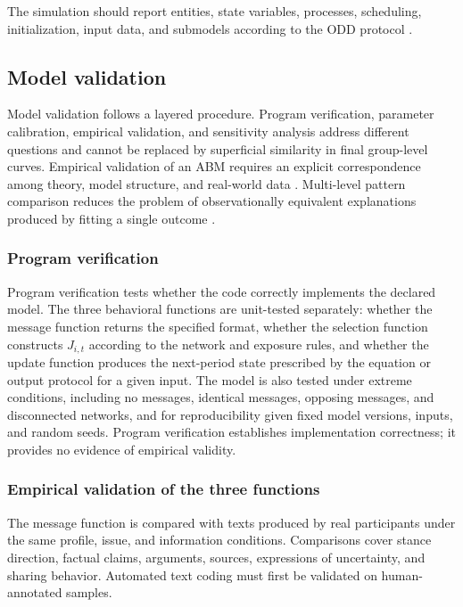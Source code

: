 \documentclass[11pt,a4paper]{article}
\begin{document}
The simulation should report entities, state variables, processes, scheduling, initialization, input data, and submodels according to the ODD protocol \cite{grimm2020}.

\subsection{Model validation}

Model validation follows a layered procedure. Program verification, parameter calibration, empirical validation, and sensitivity analysis address different questions and cannot be replaced by superficial similarity in final group-level curves. Empirical validation of an ABM requires an explicit correspondence among theory, model structure, and real-world data \cite{windrum2007}. Multi-level pattern comparison reduces the problem of observationally equivalent explanations produced by fitting a single outcome \cite{grimm2005}.

\subsubsection{Program verification}

Program verification tests whether the code correctly implements the declared model. The three behavioral functions are unit-tested separately: whether the message function returns the specified format, whether the selection function constructs $J_{i,t}$ according to the network and exposure rules, and whether the update function produces the next-period state prescribed by the equation or output protocol for a given input. The model is also tested under extreme conditions, including no messages, identical messages, opposing messages, and disconnected networks, and for reproducibility given fixed model versions, inputs, and random seeds. Program verification establishes implementation correctness; it provides no evidence of empirical validity.

\subsubsection{Empirical validation of the three functions}

The message function is compared with texts produced by real participants under the same profile, issue, and information conditions. Comparisons cover stance direction, factual claims, arguments, sources, expressions of uncertainty, and sharing behavior. Automated text coding must first be validated on human-annotated samples.
\end{document}
